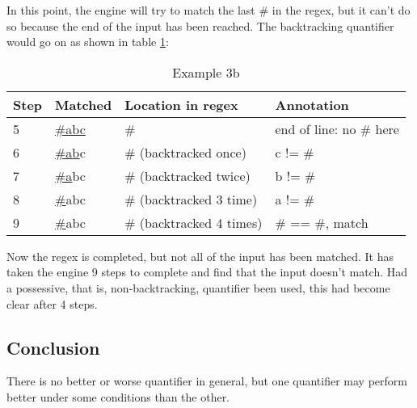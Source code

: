 In this point, the engine will try to match the last \# in the regex, but it can't do so because the end of the input has been reached. The backtracking quantifier would go on as shown in table \ref{backtracking-example_3b}:

\begin{table}[!ht]
\center
\begin{tabular}{|l|l|l|l|}
	\hline
	Step & Matched & Location in regex & Annotation \\ \hline
	5 & \underline{\#abc} & \# & end of line: no \# here \\ \hline
	6 & \underline{\#ab}c & \# (backtracked once) & c != \# \\ \hline
	7 & \underline{\#a}bc & \# (backtracked twice) & b != \# \\ \hline
	8 & \underline{\#}abc & \# (backtracked 3 time) & a != \# \\ \hline
	9 & \underline{\#}abc & \# (backtracked 4 times) & \# == \#, match \\
	\hline
\end{tabular}
\caption{Example 3b}\label{backtracking-example_3b}
\end{table}

Now the regex is completed, but not all of the input has been matched. It has taken the engine 9 steps to complete and find that the input doesn't match. Had a possessive, that is, non-backtracking, quantifier been used, this had become clear after 4 steps.

\subsection{Conclusion}

There is no better or worse quantifier in general, but one quantifier may perform better under some conditions than the other.
